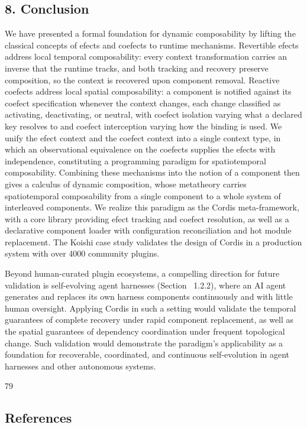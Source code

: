 \documentclass[
  10
]{article}
\begin{document}
\subsection{8. Conclusion}\label{conclusion}

We have presented a formal foundation for dynamic composability by
lifting the classical concepts of efects and coefects to runtime
mechanisms. Revertible efects address local temporal composability:
every context transformation carries an inverse that the runtime tracks,
and both tracking and recovery preserve composition, so the context is
recovered upon component removal. Reactive coefects address local
spatial composability: a component is notified against its coefect
specification whenever the context changes, each change classified as
activating, deactivating, or neutral, with coefect isolation varying
what a declared key resolves to and coefect interception varying how the
binding is used. We unify the efect context and the coefect context into
a single context type, in which an observational equivalence on the
coefects supplies the efects with independence, constituting a
programming paradigm for spatiotemporal composability. Combining these
mechanisms into the notion of a component then gives a calculus of
dynamic composition, whose metatheory carries spatiotemporal
composability from a single component to a whole system of interleaved
components. We realize this paradigm as the Cordis meta-framework, with
a core library providing efect tracking and coefect resolution, as well
as a declarative component loader with configuration reconciliation and
hot module replacement. The Koishi case study validates the design of
Cordis in a production system with over 4000 community plugins.

Beyond human-curated plugin ecosystems, a compelling direction for
future validation is self-evolving agent harnesses (Section~ 1.2.2),
where an AI agent generates and replaces its own harness components
continuously and with little human oversight. Applying Cordis in such a
setting would validate the temporal guarantees of complete recovery
under rapid component replacement, as well as the spatial guarantees of
dependency coordination under frequent topological change. Such
validation would demonstrate the paradigm's applicability as a
foundation for recoverable, coordinated, and continuous self-evolution
in agent harnesses and other autonomous systems.

79

\subsection{References}\label{references}
\end{document}

